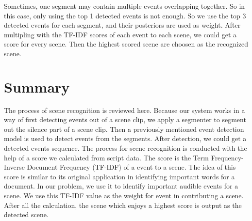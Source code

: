 Sometimes, one segment may contain multiple events overlapping together. 
So in this case, only using the top 1 detected events is not enough. 
So we use the top 3 detected events for each segment, and their posteriors are used as weight. 
After multipling with the TF-IDF scores of each event to each scene, we could get a score for every scene. 
Then the highest scored scene are choosen as the recognized scene. 

\section{Summary}
The process of scene recognition is reviewed here. 
Because our system works in a way of first detecting events out of a scene clip, we apply a segmenter to segment out the silence part of a scene clip. 
Then a previously mentioned event detection model is used to detect events from the segments. 
After detection, we could get a detected events sequence. 
The process for scene recognition is conducted with the help of a score we calculated from script data. 
The score is the Term Frequency-Inverse Document Frequency (TF-IDF) of a event to a scene. 
The idea of this score is similar to its original application in identifying important words for a document. 
In our problem, we use it to identify important audible events for a scene. 
We use this TF-IDF value as the weight for event in contributing a scene. 
After all the calculation, the scene which enjoys a highest score is output as the detected scene. 

